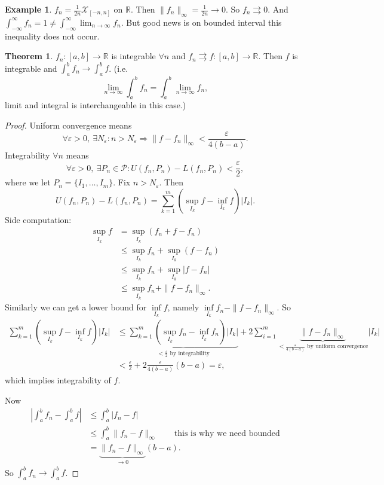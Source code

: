 \documentclass[a4paper]{article}
\theoremstyle{definition}
\newtheorem{thm}[defn]{Theorem}
\newtheorem{example}[defn]{Example}
\begin{document}
\begin{example}
$f_n=\frac{1}{2n} \mathcal X_{[-n,n]}$ on $\mathbb R$. Then $\|f_n\|_\infty = \frac{1}{2n} \rightarrow 0$. So $f_n \rightrightarrows 0$. And $\int_{-\infty}^\infty f_n=1\neq \int_{-\infty}^\infty \lim_{n\rightarrow \infty} f_n$. But good news is on bounded interval this inequality does not occur.
\end{example}
\begin{thm}
$f_n:[a,b]\rightarrow \mathbb R$ is integrable $\forall n$ and $f_n \rightrightarrows f:[a,b]\rightarrow \mathbb R$. Then $f$ is integrable and $\int_a^b f_n \rightarrow \int_a^b f$. (i.e.
\[
\lim_{n\rightarrow \infty} \int_a^b f_n = \int_a^b \lim_{n\rightarrow \infty} f_n,
\]
limit and integral is interchangeable in this case.)
\end{thm}
\begin{proof}
Uniform convergence means
\[
\forall \varepsilon >0,\ \exists N_\varepsilon : n>N_\varepsilon \Rightarrow \|f-f_n\|_\infty < \frac{\varepsilon}{4(b-a)} .
\]
Integrability $\forall n$ means
\[
\forall \varepsilon >0,\ \exists P_n \in \mathcal P : U(f_n,P_n)-L(f_n,P_n)<\frac{\varepsilon}2 ,
\]
where we let $P_n=\{I_1,\ldots,I_m\}$. Fix $n>N_\varepsilon$. Then
\[
U(f_n,P_n)-L(f_n,P_n)=\sum_{k=1}^m \left(\underset{I_k}{\sup} f-\underset{I_k}{\inf} f \right) |I_k|.
\]
Side computation:
\[
\begin{aligned}
    \underset{I_k}{\sup} f &= \underset{I_k}{\sup} (f_n+f-f_n)\\&\leq \underset{I_k}{\sup} f_n+\underset{I_k}{\sup} (f-f_n)\\&\leq \underset{I_k}{\sup} f_n + \underset{I_k}{\sup} |f-f_n|\\&\leq \underset{I_k}{\sup} f_n+\|f-f_n\|_\infty .
\end{aligned}
\]
Similarly we can get a lower bound for $\underset{I_k}{\inf} f$, namely $\underset{I_k}{\inf} f_n-\|f-f_n\|_\infty .$ So
\[
\begin{aligned}\sum_{k=1}^m \left(\underset{I_k}{\sup} f-\underset{I_k}{\inf} f \right) |I_k| &\leq \underbrace{\sum_{k=1}^m \left(\underset{I_k}{\sup} f_n-\underset{I_k}{\inf} f_n \right) |I_k|}_{<\frac{\varepsilon}{2} \text{ by integrability}}+2\sum_{i=1}^m \underbrace{\|f-f_n\|_\infty}_{<\frac{\varepsilon}{4(b-a)} \text{ by uniform convergence}} |I_k| \\&< \frac{\varepsilon}{2}+2\frac{\varepsilon}{4(b-a)}(b-a)=\varepsilon ,\end{aligned}
\]
which implies integrability of $f$.

Now
\[
\begin{aligned}\left| \int_a^b f_n - \int_a^b f \right| &\leq \int_a^b |f_n-f| \\& \leq \int_a^b \|f_n-f\|_\infty \qquad \text{this is why we need bounded} \\&= \underbrace{\|f_n-f\|_\infty}_{\rightarrow 0} (b-a) .\end{aligned}
\]
So $\int_a^b f_n \rightarrow \int_a^b f$.
\end{proof}
\end{document}

